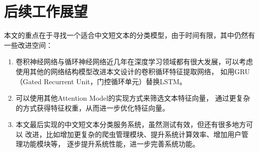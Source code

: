 \section{后续工作展望}
本文的重点在于寻找一个适合中文短文本的分类模型，由于时间有限，其中仍然有一些改进空间：
\begin{enumerate}
    \item 卷积神经网络与循环神经网络近几年在深度学习领域都有很大发展，可以考虑
    使用其他的网络结构模型改进本文设计的卷积循环特征提取网络，
    如用GRU（Gated Recurrent Unit，门控循环单元）替换LSTM。
    \item 可以使用其他Attention Model的实现方式来筛选文本特征向量，
    通过更复杂的方式获得特征权重，从而进一步优化特征向量。
    \item 本文最后实现的中文短文本分类服务系统，虽然测试有效，但还有很多地方可以
    改进，比如增加更复杂的爬虫管理模块、提升系统计算效率、增加用户管理功能模块等，
    逐步提升系统性能，进一步完善系统功能。
\end{enumerate}